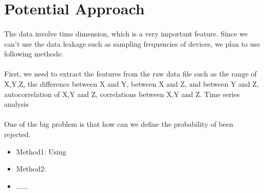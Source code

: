 \documentclass{article}
\begin{document}
	

	
	\section{Potential Approach} %
	\label{sec:potential_approach}
	\paragraph{}The data involve time dimension, which is a very important feature. Since we can't use the data leakage such as sampling frequencies of devices, we plan to use following methods:
	
	
	\paragraph{} First, we need to extract the features from the raw data file such as the range of X,Y,Z, the difference between X and Y, between X and Z, and between Y and Z, autocorrelation of X,Y and Z, correlations between X,Y and Z.  Time series analysis 
	
	
	\paragraph{} One of the big problem is that how can we define the probability of been rejected. 
	\begin{itemize}
		\item Method1: Using 
		\item Method2:
		\item ......
	\end{itemize}
	
	
	
	
\end{document}

